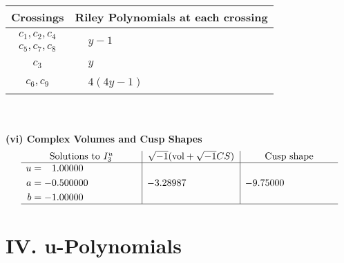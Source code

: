 \documentclass[1p]{elsarticle_modified}
\theoremstyle{definition}
\newcommand{\I}{\sqrt{-1}}
\begin{document}
\begin{tabular}{m{50pt}|m{274pt}}
Crossings & \hspace{64pt}Riley Polynomials at each crossing \\
\hline $$\begin{aligned}c_{1},c_{2},c_{4}\\c_{5},c_{7},c_{8}\end{aligned}$$&$\begin{aligned}
&y-1
\end{aligned}$\\
\hline $$\begin{aligned}c_{3}\end{aligned}$$&$\begin{aligned}
&y
\end{aligned}$\\
\hline $$\begin{aligned}c_{6},c_{9}\end{aligned}$$&$\begin{aligned}
&4(4 y-1)
\end{aligned}$\\
\hline
\end{tabular}\\~\\
\newpage\flushleft \textbf{(vi) Complex Volumes and Cusp Shapes}
$$\begin{array}{c|c|c}  
\text{Solutions to }I^u_{3}& \I (\text{vol} + \sqrt{-1}CS) & \text{Cusp shape}\\
 \hline 
\begin{aligned}
u &= \phantom{-}1.00000\phantom{ +0.000000I} \\
a &= -0.500000\phantom{ +0.000000I} \\
b &= -1.00000\phantom{ +0.000000I}\end{aligned}
 & -3.28987\phantom{ +0.000000I} & -9.75000\phantom{ +0.000000I}\\
 \hline 
 \end{array}$$\newpage
\newpage\renewcommand{\arraystretch}{1}
\centering \section*{ IV. u-Polynomials}
\end{document}
